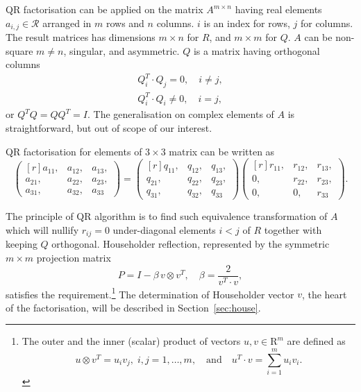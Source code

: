 \begin{refsection}
QR factorisation can be applied on the matrix $A^{m \times n}$ having real
elements $a_{i,j} \in \mathcal{R}$ arranged in $m$ rows and $n$ columns.
$i$ is an index for rows, $j$ for columns.
The result matrices has dimensions $m \times n$ for $R$, and
$m \times m$ for $Q$.
$A$ can be non-square $m \ne n$, singular, and asymmetric.
$Q$ is a matrix having orthogonal columns
\begin{align*}
  Q_i^T \cdot Q_j = 0, \quad i \ne j,\\
  Q_i^T \cdot Q_i \ne 0, \quad i = j,
\end{align*}
or $Q^T Q = Q Q^T = I$.
The generalisation on complex elements of $A$ is straightforward,
but out of scope of our interest.

QR factorisation for elements of $3 \times 3$ matrix can be written as
\begin{equation}
    \begin{pmatrix*}[r]
      a_{11}, & a_{12}, & a_{13},\\
      a_{21}, & a_{22}, & a_{23},\\
      a_{31}, & a_{32}, & a_{33}
    \end{pmatrix*}
    =
    \begin{pmatrix*}[r]
      q_{11}, & q_{12}, & q_{13},\\
      q_{21}, & q_{22}, & q_{23},\\
      q_{31}, & q_{32}, & q_{33}
    \end{pmatrix*}
    \begin{pmatrix*}[r]
      r_{11}, & r_{12}, & r_{13},\\
      0,     & r_{22}, & r_{23},\\
      0,     & 0,     & r_{33}
    \end{pmatrix*}.
\end{equation}

The principle of QR algorithm is to find such equivalence transformation
of $A$
which will nullify $r_{ij} = 0$ under-diagonal elements $i < j$ of $R$
together with keeping $Q$ orthogonal.
Householder reflection, represented by
the symmetric $m \times m$ projection matrix
\begin{equation} \label{eq:housemat}
  P = I - \beta \, v \otimes v^T, \quad
  \beta = \frac{2}{v^T \cdot v},
\end{equation}
satisfies the requirement.\footnote{
  The outer and the inner (scalar) product of vectors
  $u,v \in \mathrm{R}^m$ are defined as
  \[
  u \otimes v^T = u_i v_j, \; i,j = 1, \ldots, m,
  \quad \text{and} \quad
  u^T \! \cdot v = \sum_{i=1}^m u_i v_i.
  \]
}
The determination of Householder vector $v$, the heart of the factorisation,
will be described in Section~\ref{sec:house}.


\end{refsection}
